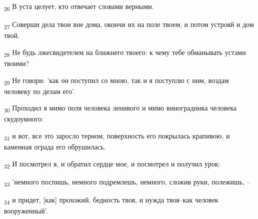 \begin{tcolorbox}
\textsubscript{26} В уста целует, кто отвечает словами верными.
\end{tcolorbox}
\begin{tcolorbox}
\textsubscript{27} Соверши дела твои вне дома, окончи их на поле твоем, и потом устрояй и дом твой.
\end{tcolorbox}
\begin{tcolorbox}
\textsubscript{28} Не будь лжесвидетелем на ближнего твоего: к чему тебе обманывать устами твоими?
\end{tcolorbox}
\begin{tcolorbox}
\textsubscript{29} Не говори: 'как он поступил со мною, так и я поступлю с ним, воздам человеку по делам его'.
\end{tcolorbox}
\begin{tcolorbox}
\textsubscript{30} Проходил я мимо поля человека ленивого и мимо виноградника человека скудоумного:
\end{tcolorbox}
\begin{tcolorbox}
\textsubscript{31} и вот, все это заросло терном, поверхность его покрылась крапивою, и каменная ограда его обрушилась.
\end{tcolorbox}
\begin{tcolorbox}
\textsubscript{32} И посмотрел я, и обратил сердце мое, и посмотрел и получил урок:
\end{tcolorbox}
\begin{tcolorbox}
\textsubscript{33} 'немного поспишь, немного подремлешь, немного, сложив руки, полежишь, --
\end{tcolorbox}
\begin{tcolorbox}
\textsubscript{34} и придет, [как] прохожий, бедность твоя, и нужда твоя--как человек вооруженный'.
\end{tcolorbox}
